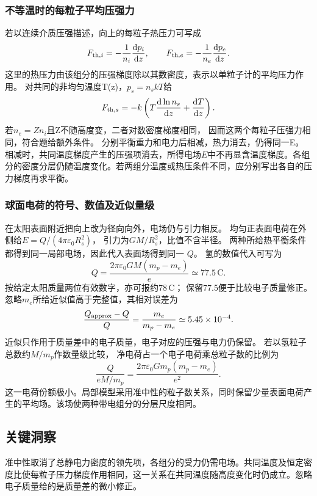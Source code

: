 \documentclass[UTF8,fontset=fandol,a4paper,11pt]{ctexart}
\newcommand{\dd}{\mathop{}\!\mathrm{d}}
\begin{document}
\subsubsection*{不等温时的每粒子平均压强力}
若以连续介质压强描述，向上的每粒子热压力可写成
\[
F_{{\rm th},i}=-\frac1{n_i}\frac{\dd p_i}{\dd z},
\qquad
F_{{\rm th},e}=-\frac1{n_e}\frac{\dd p_e}{\dd z}.
\]
这里的热压力由该组分的压强梯度除以其数密度，表示以单粒子计的平均压力作用。
对共同的非均匀温度T(z)，$p_s=n_s kT$给
\[
F_{{\rm th},s}
=-k\left(T\frac{\dd\ln n_s}{\dd z}
+\frac{\dd T}{\dd z}\right).
\]
若$n_e=Zn_i$且Z不随高度变，二者对数密度梯度相同，
因而这两个每粒子压强力相同，符合题给额外条件。
分别平衡重力和电力后相减，热力消去，仍得同一E。
相减时，共同温度梯度产生的压强项消去，所得电场$E$中不再显含温度梯度。各组分的密度分层仍随温度变化。若两组分温度或热压条件不同，应分别写出各自的压力梯度再求平衡。

\subsubsection*{球面电荷的符号、数值及近似量级}
在太阳表面附近把向上改为径向向外，电场仍与引力相反。
均匀正表面电荷在外侧给$E=Q/(4\pi\varepsilon_0R_s^2)$，
引力为$GM/R_s^2$，比值不含半径。
两种所给热平衡条件都得到同一局部电场，因此代入表面场得到同一 $Q$。
氢的数值代入可写为
\[
Q=\frac{2\pi\varepsilon_0GM(m_p-m_e)}e
\simeq77.5\,\mathrm C.
\]
按给定太阳质量两位有效数字，亦可报约$78\,\mathrm C$；
保留77.5便于比较电子质量修正。
忽略$m_e$所给近似值高于完整值，其相对误差为
\[
\frac{Q_{\rm approx}-Q}{Q}
=\frac{m_e}{m_p-m_e}\simeq5.45\times10^{-4}.
\]
近似只作用于质量差中的电子质量，电子对应的压强与电力仍保留。
若以氢粒子总数约$M/m_p$作数量级比较，
净电荷占一个电子电荷乘总粒子数的比例为
\[
\frac{Q}{eM/m_p}
=\frac{2\pi\varepsilon_0Gm_p(m_p-m_e)}{e^2}.
\]
这一电荷份额极小。局部模型采用准中性的粒子数关系，同时保留少量表面电荷产生的平均场。该场使两种带电组分的分层尺度相同。




\subsection*{关键洞察}

准中性取消了总静电力密度的领先项，各组分的受力仍需电场。共同温度及恒定密度比使每粒子压力梯度作用相同，这一关系在共同温度随高度变化时仍成立。忽略电子质量给的是质量差的微小修正。

\end{document}
